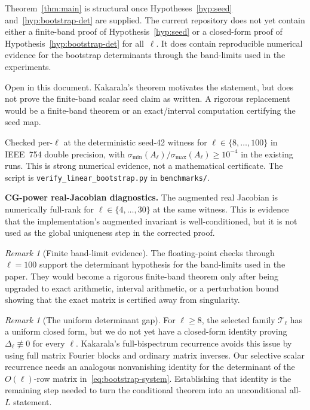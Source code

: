 \documentclass[11pt]{article}
\theoremstyle{plain}
\theoremstyle{definition}
\theoremstyle{remark}
\newtheorem{remark}[theorem]{Remark}
\begin{document}
Theorem~\ref{thm:main} is structural once
Hypotheses~\ref{hyp:seed} and~\ref{hyp:bootstrap-det} are supplied.
The current repository does not yet contain either a finite-band proof
of Hypothesis~\ref{hyp:seed} or a closed-form proof of
Hypothesis~\ref{hyp:bootstrap-det} for all~$\ell$. It does contain
reproducible numerical evidence for the bootstrap determinants through
the band-limits used in the experiments.

\begin{description}[style=nextline]
  \item[\textnormal{C1.\ Finite seed injectivity (Hypothesis~\ref{hyp:seed}).}]
    Open in this document. Kakarala's theorem motivates the statement,
    but does not prove the finite-band scalar seed claim as written.
    A rigorous replacement would be a finite-band theorem or an
    exact/interval computation certifying the seed map.
  \item[\textnormal{C2.\ Bootstrap determinant evidence.}]
    Checked per-$\ell$ at the deterministic seed-42 witness for
    $\ell\in\{8,\dots,100\}$ in IEEE~754 double precision, with
    $\sigma_{\min}(A_\ell)/\sigma_{\max}(A_\ell) \ge 10^{-4}$
    in the existing runs. This is strong numerical evidence, not a
    mathematical certificate. The script is
    \texttt{verify\_linear\_bootstrap.py} in \texttt{benchmarks/}.
  \item[\textnormal{C3.}]
    \textbf{CG-power real-Jacobian diagnostics.} The augmented real Jacobian is numerically full-rank for
    $\ell\in\{4,\dots,30\}$ at the same witness. This is evidence that
    the implementation's augmented invariant is well-conditioned, but
    it is not used as the global uniqueness step in the corrected proof.
\end{description}

\begin{remark}[Finite band-limit evidence]\label{rem:numerical-evidence}
The floating-point checks through $\ell=100$ support the determinant
hypothesis for the band-limits used in the paper. They would become a
rigorous finite-band theorem only after being upgraded to exact
arithmetic, interval arithmetic, or a perturbation bound showing that
the exact matrix is certified away from singularity.
\end{remark}

\begin{remark}[The uniform determinant gap]
For $\ell\ge8$, the selected family $\mathcal{T}_\ell$ has a uniform
closed form, but we do not yet have a closed-form identity proving
$\Delta_\ell\not\equiv0$ for every $\ell$. Kakarala's full-bispectrum
recurrence avoids this issue by using full matrix Fourier blocks and
ordinary matrix inverses. Our selective scalar recurrence needs an
analogous nonvanishing identity for the determinant of the
$O(\ell)$-row matrix in~\eqref{eq:bootstrap-system}. Establishing that
identity is the remaining step needed to turn the conditional theorem
into an unconditional all-$L$ statement.
\end{remark}
\end{document}
